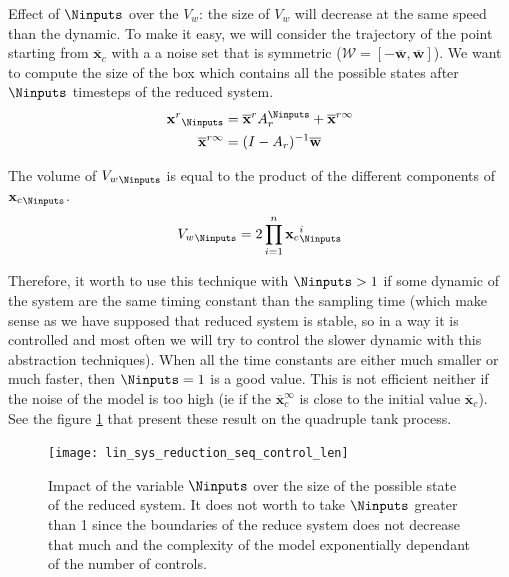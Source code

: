 Effect of $\Ninputs$ over the $V_w$: the size of $V_w$ will decrease at the same speed than the dynamic. To make it easy, we will consider the trajectory of the point starting from $\overline{\mathbf{x}}_c$ with a a noise set that is symmetric ($\mathcal{W} = \left [ -\overline{\mathbf{w}},\overline{\mathbf{w}} \right ]$). We want to compute the size of the box which contains all the possible states after $\Ninputs$ timesteps of the reduced system.
\begin{equation}
\begin{split}
{\mathbf{x}^r}_{\Ninputs} &= \overline{\mathbf{x}}^r A_r^{\Ninputs} + \overline{\mathbf{x}}^{r \infty}\\
\overline{\mathbf{x}}^{r \infty} &= (I-A_r)^{-1}\overline{\mathbf{w}}
\end{split}
\end{equation}

The volume of ${V_w}_{\Ninputs}$ is equal to the product of the different components of ${\mathbf{x}_c}_{\Ninputs}$.
\begin{equation}
{V_w}_{\Ninputs} = 2 \prod_{i=1}^n
{\mathbf{x}_c}_{\Ninputs}^i
\end{equation}

Therefore, it worth to use this technique with $\Ninputs>1$ if some dynamic of the system are the same timing constant than the sampling time (which make sense as we have supposed that reduced system is stable, so in a way it is controlled and most often we will try to control the slower dynamic with this abstraction techniques). When all the time constants are either much smaller or much faster, then $\Ninputs = 1$ is a good value.
This is not efficient neither if the noise of the model is too high (ie if the $\overline{\mathbf{x}}_c^{\infty}$ is close to the initial value $\overline{\mathbf{x}}_c$). See the figure \ref{reduced_system_bounds} that present these result on the quadruple tank process.

\begin{figure}[!ht]
  \centering
  \texttt{[image: lin\_sys\_reduction\_seq\_control\_len]}
  \caption{Impact of the variable $\Ninputs$ over the size of the possible state of the reduced system. It does not worth to take $\Ninputs$ greater than 1 since the boundaries of the reduce system does not decrease that much and the complexity of the model exponentially dependant of the number of controls.}
  \label{reduced_system_bounds}
\end{figure}

